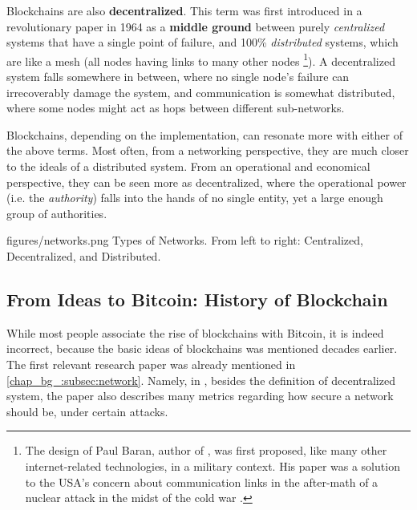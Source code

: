 
Blockchains are also \textbf{decentralized}. This term was first introduced in a revolutionary paper
in 1964 as a \textbf{middle ground} between purely \textit{centralized} systems that have a single
point of failure, and 100\% \textit{distributed} systems, which are like a mesh (all nodes having
links to many other nodes \cite{baranDistributedCommunicationsNetworks1964} \footnote{The design of
Paul Baran, author of \cite{baranDistributedCommunicationsNetworks1964}, was first proposed, like
many other internet-related technologies, in a military context. His paper was a solution to the
USA's concern about communication links in the after-math of a nuclear attack in the midst of the
cold war \cite{monicaPaulBaranOrigins}.}). A decentralized system falls somewhere in between, where
no single node's failure can irrecoverably damage the system, and communication is somewhat
distributed, where some nodes might act as hops between different sub-networks.

Blockchains, depending on the implementation, can resonate more with either of the above terms. Most
often, from a networking perspective, they are much closer to the ideals of a distributed system.
From an operational and economical perspective, they can be seen more as decentralized, where the
operational power (i.e. the \textit{authority}) falls into the hands of no single entity, yet a
large enough group of authorities.

\figuremacro
	{figures/networks.png}
	{Types of Networks.}
	{From left to right: Centralized, Decentralized, and Distributed.}

\subsection{From Ideas to Bitcoin: History of Blockchain} \label{chap_bg_:subsec:hisotry}

While most people associate the rise of blockchains with Bitcoin, it is indeed incorrect, because
the basic ideas of blockchains was mentioned decades earlier. The first relevant research paper was
already mentioned in \ref{chap_bg_:subsec:network}. Namely, in
\cite{baranDistributedCommunicationsNetworks1964}, besides the definition of decentralized system,
the paper also describes many metrics regarding how secure a network should be, under certain
attacks.

